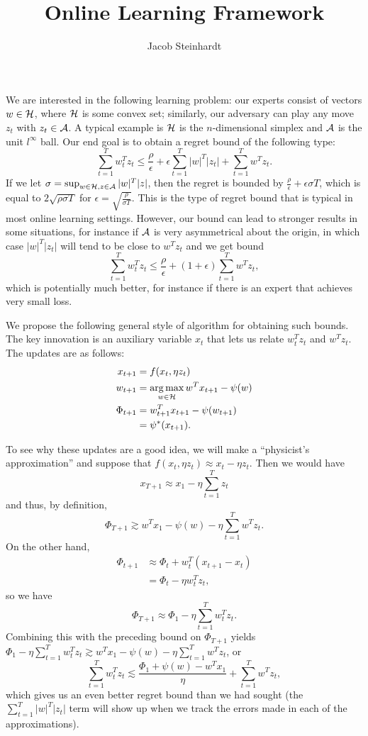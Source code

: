 \documentclass[11pt]{article}
\title{Online Learning Framework}
\author{Jacob Steinhardt}
\begin{document}
\maketitle
We are interested in the following learning problem: our experts 
consist of vectors $w \in \mathcal{H}$, where $\mathcal{H}$ is some convex 
set; similarly, our adversary can play any move $z_t$ with 
$z_t \in \mathcal{A}$. A typical example is $\mathcal{H}$ is the $n$-dimensional 
simplex and $\mathcal{A}$ is the unit $l^{\infty}$ ball. Our end goal is 
to obtain a regret bound of the following type:
\[ \sum_{t=1}^T w_t^Tz_t \leq \frac{\rho}{\epsilon} + \epsilon \sum_{t=1}^T |w|^T|z_t| + \sum_{t=1}^T w^Tz_t. \]
If we let $\sigma = \sup_{w \in \mathcal{H}, z \in \mathcal{A}} |w|^T|z|$, then the regret is bounded by
$\frac{\rho}{\epsilon} + \epsilon \sigma T$, which is equal to $2\sqrt{\rho \sigma T}$ for 
$\epsilon = \sqrt{\frac{\rho}{\sigma T}}$. This is the type of regret bound that is typical 
in most online learning settings. However, our bound can lead to stronger results in some 
situations, for instance if $\mathcal{A}$ is very asymmetrical about the origin, in which case 
$|w|^T|z_t|$ will tend to be close to $w^Tz_t$ and we get bound
\[ \sum_{t=1}^T w_t^Tz_t \leq \frac{\rho}{\epsilon} + (1+\epsilon)\sum_{t=1}^T w^Tz_t, \]
which is potentially much better, for instance if there is an expert that achieves 
very small loss.

We propose the following general style of algorithm for obtaining such 
bounds. The key innovation is an auxiliary variable $x_t$ that lets us 
relate $w_t^Tz_t$ and $w^Tz_t$. The updates are as follows:
\begin{align*}
x_{t+1} &= f(x_t, \eta z_t) \\
w_{t+1} &= \argmax_{w \in \sH} w^Tx_{t+1} - \psi(w) \\
\Phi_{t+1} &= w_{t+1}^Tx_{t+1} - \psi(w_{t+1})  \\ &= \psi^*(x_{t+1}).
\end{align*}

To see why these updates are a good idea, we will make a ``physicist's approximation'' 
and suppose that $f(x_t, \eta z_t) \approx x_t - \eta z_t$. Then we would have
\[ x_{T+1} \approx x_1 - \eta \sum_{t=1}^T z_t \] and thus, by definition, 
\[ \Phi_{T+1} \gtrsim w^Tx_1 - \psi(w) - \eta \sum_{t=1}^T w^Tz_t. \]
On the other hand, 
\begin{align*}
\Phi_{t+1} &\approx \Phi_t + w_t^T(x_{t+1} - x_t) \\
           &= \Phi_t - \eta w_t^T z_t,
\end{align*}
so we have 
\[ \Phi_{T+1} \approx \Phi_1 - \eta \sum_{t=1}^T w_t^Tz_t. \]
Combining this with the preceding bound on $\Phi_{T+1}$ yields
$\Phi_1 - \eta \sum_{t=1}^T w_t^Tz_t \gtrsim w^Tx_1 - \psi(w) - \eta \sum_{t=1}^T w^Tz_t$, 
or
\[ \sum_{t=1}^T w_t^Tz_t \lesssim \frac{\Phi_1 + \psi(w) - w^Tx_1}{\eta} + \sum_{t=1}^T w^Tz_t, \]
which gives us an even better regret bound than we had sought (the $\sum_{t=1}^T |w|^T|z_t|$ term 
will show up when we track the errors made in each of the approximations).
\end{document}
